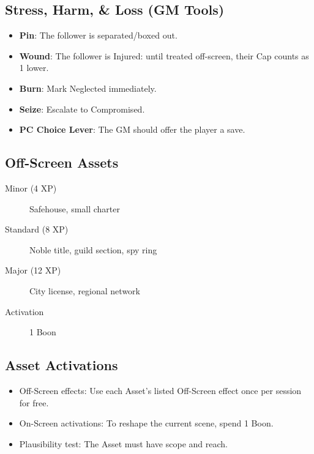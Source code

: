 \subsection{Stress, Harm, \& Loss (GM Tools)}
\begin{itemize}
    \item \textbf{Pin}: The follower is separated/boxed out.
    \item \textbf{Wound}: The follower is Injured: until treated off-screen, their Cap counts as 1 lower.
    \item \textbf{Burn}: Mark Neglected immediately.
    \item \textbf{Seize}: Escalate to Compromised.
    \item \textbf{PC Choice Lever}: The GM should offer the player a save.
\end{itemize}

\subsection{Off-Screen Assets}

\begin{description}
\item[Minor (4 XP)] Safehouse, small charter
\item[Standard (8 XP)] Noble title, guild section, spy ring
\item[Major (12 XP)] City license, regional network
\item[Activation] 1 Boon
\end{description}

\subsection{Asset Activations}
\begin{itemize}
    \item Off-Screen effects: Use each Asset's listed Off-Screen effect once per session for free.
    \item On-Screen activations: To reshape the current scene, spend 1 Boon.
    \item Plausibility test: The Asset must have scope and reach.
\end{itemize}

